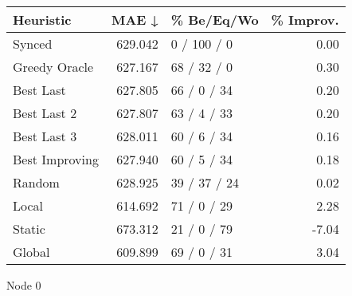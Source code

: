 \begin{tabular}{lrlr}
\toprule
\textbf{Heuristic} & \textbf{MAE ↓} & \textbf{\% Be/Eq/Wo} & \textbf{\% Improv.} \\
\midrule
            Synced &        629.042 &          0 / 100 / 0 &                0.00 \\
     Greedy Oracle &        627.167 &          68 / 32 / 0 &                0.30 \\
         Best Last &        627.805 &          66 / 0 / 34 &                0.20 \\
       Best Last 2 &        627.807 &          63 / 4 / 33 &                0.20 \\
       Best Last 3 &        628.011 &          60 / 6 / 34 &                0.16 \\
    Best Improving &        627.940 &          60 / 5 / 34 &                0.18 \\
            Random &        628.925 &         39 / 37 / 24 &                0.02 \\
             Local &        614.692 &          71 / 0 / 29 &                2.28 \\
            Static &        673.312 &          21 / 0 / 79 &               -7.04 \\
            Global &        609.899 &          69 / 0 / 31 &                3.04 \\
\bottomrule
\end{tabular}
\caption{Node 0}
\label{tab:iid_lr01_le1_bs2_0}
